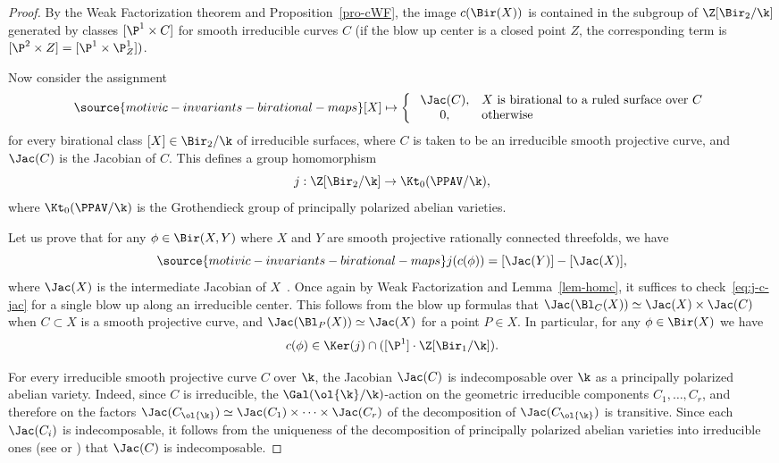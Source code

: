 \begin{proof}
By the
Weak Factorization theorem
and Proposition~\ref{pro-cWF},
the image $c(\Bir(X))$ is contained
in the subgroup of $\Z[\Bir_2/\k]$
generated by classes $[\P^1 \times C]$
for smooth irreducible curves $C$
(if the blow up center is a closed point $Z$, the
corresponding term is $[\P^2 \times Z]
= [\P^1 \times \P^1_Z])$.

Now consider the assignment
\begin{equation}\label{eq:j}
\source{motivic-invariants-birational-maps}
[X] \mapsto \left\{\begin{array}{cl}
     \; \Jac(C), & \text{$X$ is birational to a
     ruled surface over $C$} \\
     \; 0, & \text{otherwise} \\
\end{array}\right.
\end{equation}
for every birational class $[X] \in \Bir_2/\k$ of irreducible surfaces, where
$C$ is taken to be an irreducible smooth projective curve,
and $\Jac(C)$ is the Jacobian of $C$.
This defines a
group homomorphism
$$j: \Z[\Bir_2/\k] \to
\Kt_0(\PPAV/\k),$$
where $\Kt_0(\PPAV/\k)$ is the Grothendieck
group of principally
polarized abelian varieties.


Let us prove that
for any $\phi \in \Bir(X,Y)$
where $X$ and $Y$ are
smooth projective rationally connected threefolds, we have
\begin{equation}\label{eq:j-c-jac}
\source{motivic-invariants-birational-maps}
j(c(\phi)) = [\Jac(Y)] - [\Jac(X)],
\end{equation}
where $\Jac(X)$ is the intermediate Jacobian of $X$~\cite{BenoistWittenbergPerf}.
Once again by Weak Factorization
and Lemma~\ref{lem-homc},
it suffices to check~\eqref{eq:j-c-jac}
for a single blow up along an irreducible center.
This follows from
the blow up formulas
\cite[Lemma 2.10]{BenoistWittenbergPerf}
that $\Jac(\Bl_C(X)) \simeq \Jac(X) \times \Jac(C)$
when $C \subset X$ is a smooth projective curve,
and $\Jac(\Bl_P(X)) \simeq \Jac(X)$ for a point $P \in X$.
In particular, for any $\phi \in \Bir(X)$ we have
$$c(\phi) \in \Ker(j) \cap ([\P^1] \cdot \Z[\Bir_1/\k]).$$

For every irreducible smooth projective curve $C$ over $\k$,
the Jacobian $\Jac(C)$ is indecomposable over $\k$
as a principally polarized abelian variety.
Indeed, since $C$ is irreducible,
the $\Gal(\ol{\k}/\k)$-action on the geometric
irreducible components $C_1,\ldots,C_r$,
and therefore on the factors
$\Jac(C_{\ol{\k}}) \simeq \Jac(C_1) \times \cdots \times \Jac(C_r)$
of the decomposition of $\Jac(C_{\ol{\k}})$ is transitive.
Since each $\Jac(C_i)$ is indecomposable,
it follows from the uniqueness of the
decomposition of principally polarized abelian varieties into irreducible ones
(see \cite[Theorem 3.3]{jordan2016unique} or \cite{DebarrePAV})
that $\Jac(C)$ is indecomposable.


\end{proof}

